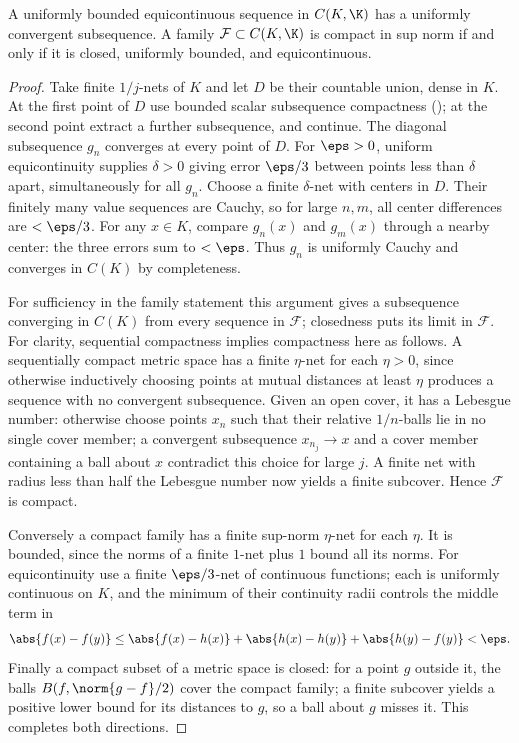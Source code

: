 \begin{theorem}
A uniformly bounded equicontinuous sequence in $C(K,\K)$ has a uniformly convergent subsequence. A family $\mathcal F\subset C(K,\K)$ is compact in sup norm if and only if it is closed, uniformly bounded, and equicontinuous.
\end{theorem}
\begin{proof}
Take finite $1/j$-nets of $K$ and let $D$ be their countable union, dense in $K$. At the first point of $D$ use bounded scalar subsequence compactness (); at the second point extract a further subsequence, and continue. The diagonal subsequence $g_n$ converges at every point of $D$. For $\eps>0$, uniform equicontinuity supplies $\delta>0$ giving error $\eps/3$ between points less than $\delta$ apart, simultaneously for all $g_n$. Choose a finite $\delta$-net with centers in $D$. Their finitely many value sequences are Cauchy, so for large $n,m$, all center differences are $<\eps/3$. For any $x\in K$, compare $g_n(x)$ and $g_m(x)$ through a nearby center: the three errors sum to $<\eps$. Thus $g_n$ is uniformly Cauchy and converges in $C(K)$ by completeness.

For sufficiency in the family statement this argument gives a subsequence converging in $C(K)$ from every sequence in $\mathcal F$; closedness puts its limit in $\mathcal F$. For clarity, sequential compactness implies compactness here as follows. A sequentially compact metric space has a finite $\eta$-net for each $\eta>0$, since otherwise inductively choosing points at mutual distances at least $\eta$ produces a sequence with no convergent subsequence. Given an open cover, it has a Lebesgue number: otherwise choose points $x_n$ such that their relative $1/n$-balls lie in no single cover member; a convergent subsequence $x_{n_j}\to x$ and a cover member containing a ball about $x$ contradict this choice for large $j$. A finite net with radius less than half the Lebesgue number now yields a finite subcover. Hence $\mathcal F$ is compact.

Conversely a compact family has a finite sup-norm $\eta$-net for each $\eta$. It is bounded, since the norms of a finite $1$-net plus $1$ bound all its norms. For equicontinuity use a finite $\eps/3$-net of continuous functions; each is uniformly continuous on $K$, and the minimum of their continuity radii controls the middle term in
\[\abs{f(x)-f(y)}\leq\abs{f(x)-h(x)}+\abs{h(x)-h(y)}+\abs{h(y)-f(y)}<\eps.\]
Finally a compact subset of a metric space is closed: for a point $g$ outside it, the balls $B(f,\norm{g-f}/2)$ cover the compact family; a finite subcover yields a positive lower bound for its distances to $g$, so a ball about $g$ misses it. This completes both directions.
\end{proof}

